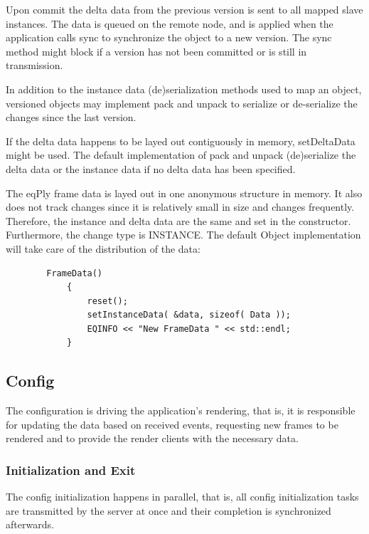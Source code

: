\documentclass[10pt,a4]{scrartcl}
\begin{document}
Upon \textsf{commit} the delta data from the previous version is sent to
all mapped slave instances. The data is queued on the remote node, and
is applied when the application calls \textsf{sync} to synchronize the
object to a new version. The \textsf{sync} method might block if a
version has not been committed or is still in transmission.

In addition to the instance data (de)serialization methods used to map
an object, versioned objects may implement \textsf{pack} and
\textsf{unpack} to serialize or de-serialize the changes since the last
version.

If the delta data happens to be layed out contiguously in memory,
\textsf{setDeltaData} might be used. The default implementation of
\textsf{pack} and \textsf{unpack} (de)serialize the delta data or the
instance data if no delta data has been specified.

The \textsf{eqPly} frame data is layed out in one anonymous structure in
memory. It also does not track changes since it is relatively small in
size and changes frequently. Therefore, the instance and delta data are
the same and set in the constructor. Furthermore, the change type is
\textsf{INSTANCE}. The default \textsf{Object} implementation will take
care of the distribution of the data:

{\footnotesize\begin{lstlisting}
        FrameData()
            {
                reset();
                setInstanceData( &data, sizeof( Data ));
                EQINFO << "New FrameData " << std::endl;
            }
\end{lstlisting}}%

\subsection{Config}

The configuration is driving the application's rendering, that is, it is
responsible for updating the data based on received events, requesting
new frames to be rendered and to provide the render clients with the
necessary data.

\subsubsection{Initialization and Exit}

The config initialization happens in parallel, that is, all config
initialization tasks are transmitted by the server at once and their
completion is synchronized afterwards. 
\end{document}
